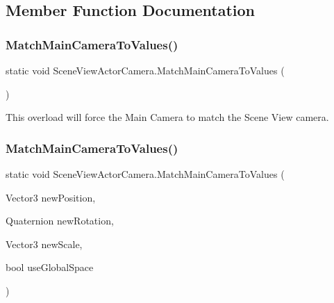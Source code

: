 \subsection{Member Function Documentation}
\mbox{\label{class_scene_view_actor_camera_a3e544b9e43a8dba5304140b3661752b1}} 
\subsubsection{\texorpdfstring{Match\+Main\+Camera\+To\+Values()}{MatchMainCameraToValues()}\hspace{0.1cm}{\footnotesize\ttfamily [1/6]}}
{\footnotesize\ttfamily static void Scene\+View\+Actor\+Camera.\+Match\+Main\+Camera\+To\+Values (\begin{DoxyParamCaption}{ }\end{DoxyParamCaption})\hspace{0.3cm}{\ttfamily [static]}}



This overload will force the Main Camera to match the Scene View camera. 

\mbox{\label{class_scene_view_actor_camera_a77349efed7b218f0c931926186cecd4e}} 
\subsubsection{\texorpdfstring{Match\+Main\+Camera\+To\+Values()}{MatchMainCameraToValues()}\hspace{0.1cm}{\footnotesize\ttfamily [2/6]}}
{\footnotesize\ttfamily static void Scene\+View\+Actor\+Camera.\+Match\+Main\+Camera\+To\+Values (\begin{DoxyParamCaption}\item[{Vector3}]{new\+Position,  }\item[{Quaternion}]{new\+Rotation,  }\item[{Vector3}]{new\+Scale,  }\item[{bool}]{use\+Global\+Space }\end{DoxyParamCaption})\hspace{0.3cm}{\ttfamily [static]}}



